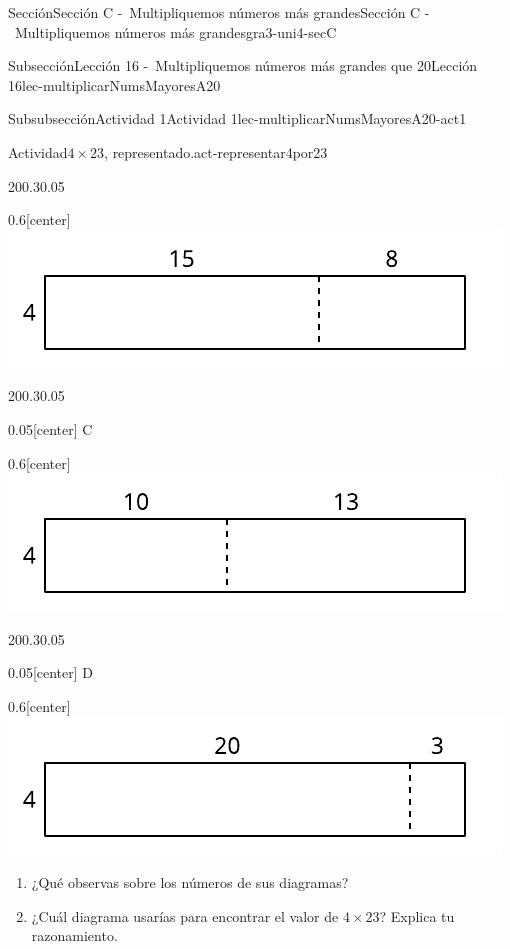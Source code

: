 \documentclass[twoside,10pt,]{article}
\begin{document}
\begin{sectionptx}{Sección}{Sección C -~Multipliquemos números más grandes}{}{Sección C -~Multipliquemos números más grandes}{}{}{gra3-uni4-secC}
\begin{subsectionptx}{Subsección}{Lección 16 -~Multipliquemos números más grandes que 20}{}{Lección 16}{}{}{lec-multiplicarNumsMayoresA20}
\begin{subsubsectionptx}{Subsubsección}{Actividad 1}{}{Actividad 1}{}{}{lec-multiplicarNumsMayoresA20-act1}
\begin{activity}{Actividad}{\(4\times 23\), representado.}{act-representar4por23}
\begin{enumerate}
\begin{sidebyside}{2}{0}{0.3}{0.05}
\begin{sbspanel}{0.6}[center]
\includegraphics[width=\linewidth]{external/svg-source/tikz-file-152972-scale13.pdf}
\end{sbspanel}%
\end{sidebyside}%
\begin{sidebyside}{2}{0}{0.3}{0.05}%
\begin{sbspanel}{0.05}[center]%
C%
\end{sbspanel}%
\begin{sbspanel}{0.6}[center]%
\includegraphics[width=\linewidth]{external/svg-source/tikz-file-152973-scale13.pdf}
\end{sbspanel}%
\end{sidebyside}%
\begin{sidebyside}{2}{0}{0.3}{0.05}%
\begin{sbspanel}{0.05}[center]%
D%
\end{sbspanel}%
\begin{sbspanel}{0.6}[center]%
\includegraphics[width=\linewidth]{external/svg-source/tikz-file-152974-scale13.pdf}
\end{sbspanel}%
\end{sidebyside}%
%
\begin{enumerate}
\item{}¿Qué observas sobre los números de sus diagramas?%
\item{}¿Cuál diagrama usarías para encontrar el valor de \(4\times 23\)? Explica tu razonamiento.%

\end{enumerate}
\end{enumerate}
\end{activity}
\end{subsubsectionptx}
\end{subsectionptx}
\end{sectionptx}
\end{document}
